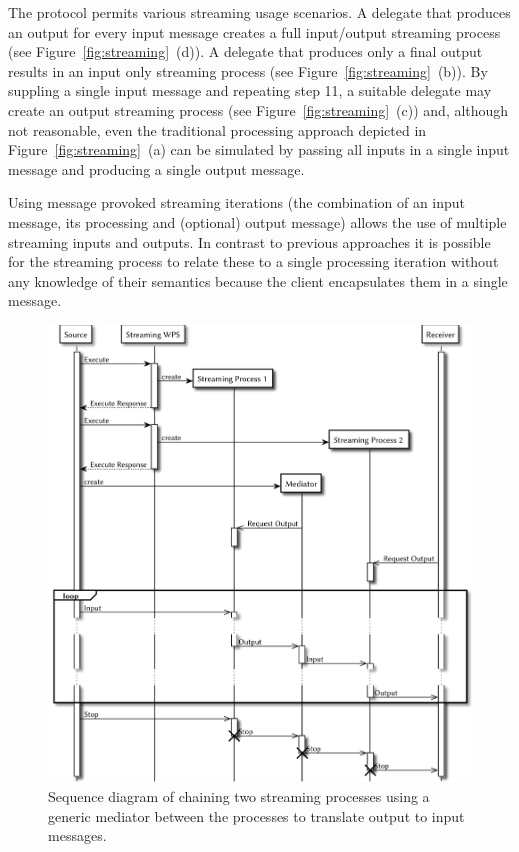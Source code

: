 		The protocol permits various streaming usage scenarios. A delegate that produces an output for every input message creates a full input/output streaming process (see Figure~\ref{fig:streaming}~(d)). A delegate that produces only a final output results in an input only streaming process (see Figure~\ref{fig:streaming}~(b)). By suppling a single input message and repeating step 11, a suitable delegate may create an output streaming process (see Figure~\ref{fig:streaming}~(c)) and, although not reasonable, even the traditional processing approach depicted in Figure~\ref{fig:streaming}~(a) can be simulated by passing all inputs in a single input message and producing a single output message.

		Using message provoked streaming iterations (the combination of an input message, its processing and (optional) output message) allows the use of multiple streaming inputs and outputs. In contrast to previous approaches it is possible for the streaming process to relate these to a single processing iteration without any knowledge of their semantics because the client encapsulates them in a single message.

		\begin{figure}[!htb]
			\centering
			\includegraphics[width=1\textwidth]{figures/sequence-diagramm-chain.pdf}
			\caption{\label{fig:sd:chain}Sequence diagram of chaining two streaming processes using a generic mediator between the processes to translate output to input messages.}
		\end{figure}

